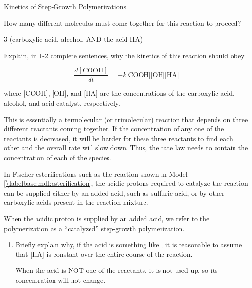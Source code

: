 \begin{activity}{Kinetics of Step-Growth Polymerizations}
\begin{ctqs}
		\question How many different molecules must come together for this reaction to proceed?
		
			\begin{solution}[0.5in]{}
				3 (carboxylic acid, alcohol, AND the acid HA)
			\end{solution}
		
		\question Explain, in 1-2 complete sentences, why the kinetics of this reaction should obey
		
			\begin{equation*}
				\frac{d[\text{COOH}]}{dt} = - k \text{[COOH][OH][HA]}
			\end{equation*}
			
			where [COOH], [OH], and [HA] are the concentrations of the carboxylic acid, alcohol, and acid catalyst, respectively.\label{\labelbase:ctq:fisherratelaw}
			
				\begin{solution}[1.25in]{}
					This is essentially a termolecular (or trimolecular) reaction that depends on three different reactants coming together.  If the concentration of any one of the reactants is decreased, it will be harder for these three reactants to find each other and the overall rate will slow down.  Thus, the rate law needs to contain the concentration of each of the species.
				\end{solution}
		
\end{ctqs}

\begin{infobox}
	In Fischer esterifications such as the reaction shown in Model \ref{\labelbase:mdl:esterification}, the acidic protons required to catalyze the reaction can be supplied either by an added acid, such as sulfuric acid, or by other carboxylic acids present in the reaction mixture.
\end{infobox}

\begin{ctqs}
	
	\question When the acidic proton is supplied by an added acid, we refer to the polymerization as a ``catalyzed'' step-growth polymerization.
	
		\begin{enumerate}
			\item Briefly explain why, if the acid is something like , it is reasonable to assume that [HA] is constant over the entire course of the reaction.
			
				\begin{solution}[0.75in]{}
					When the acid is NOT one of the reactants, it is not used up, so its concentration will not change.
				\end{solution}
			

\end{enumerate}
\end{ctqs}
\end{activity}

